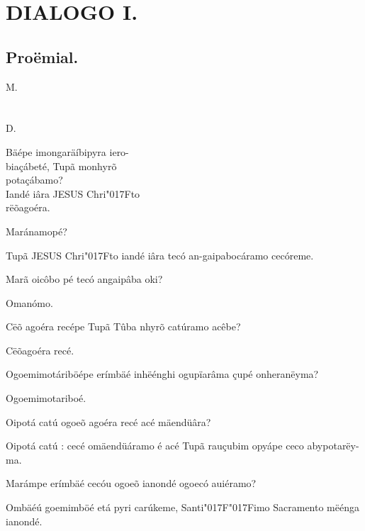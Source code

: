 \documentclass[openany,titlepage,12pt]{book}
\renewcommand{\chaptermark}[1]{\markboth{#1}{}}
\renewcommand{\sectionmark}[1]{\gdef\rightmark{#1}}
\newcommand{\lgS}{\char"017F}
\newcommand{\lgSS}{\char"017F\char"017F}
\begin{document}
\section{DIALOGO I.}
\unskip\vspace{-3pt}
\subsection{Proëmial.}
\chaptermark{Dialogo I.}
\sectionmark{Da Oraçãõ de Horto.}

\hspace*{-1.5ex}\begin{minipage}[t]{0.03\linewidth}
    M.\\ \\ \\D.\\ 
\end{minipage}
\hspace*{1ex}\begin{minipage}[t]{1.08\linewidth}
    \lettrine
    [findent =-2pt, nindent=0pt, loversize=-0.2, lraise=0.05, lines=5]
    {}{B}äépe imongaräíbipyra iero-\\
    \hspace*{2ex}biaçábeté, Tupã monhyrõ\\
    \hspace*{2ex}potaçábamo?\\
    Iandé iâra JESUS Chri\lgS to\\
    \hspace*{2ex}rëõagoéra.
\end{minipage}
\begin{alternate}
    \item Maránamopé?
    \item Tupã JESUS Chri\lgS to iandé iâra 
    tecó an-gaipabocáramo cecóreme.
    \item Marã oicôbo pé tecó angaipâba oki?
    \item Omanómo.
    \item Cëõ agoéra recépe Tupã Tûba nhyrõ
    catúramo acêbe?
    \item Cëõagoéra recé.
    \item Ogoemimotáriböépe erímbäé inhëénghi
    ogupïarâma çupé onheranëyma?
    \item Ogoemimotariboé.
    \item Oipotá catú ogoeõ agoéra recé acé\linebreak
    mäendüâra?
    \item Oipotá catú : cecé omäendüáramo é acé
    Tupã rauçubim opyápe ceco abypotarëy-ma.
    \item Marámpe erímbäé cecóu ogoeõ ianondé
    ogoecó auiéramo?
    \item Ombäéú goemimböé etá pyri carúkeme,
    Santi\lgSS imo Sacramento mëénga ianondé.

\end{alternate}
\end{document}

